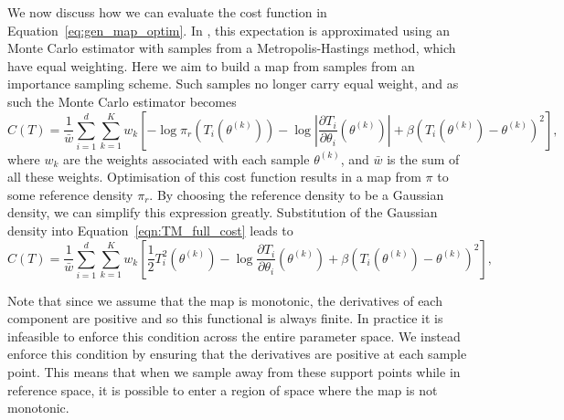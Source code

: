 \documentclass[final]{siamltex}
\newcommand{\edit}[1]{#1}
\begin{document}
\edit{We now discuss how we can evaluate the cost function in
Equation~\eqref{eq:gen_map_optim}. In \cite{parno2018transport}, this
expectation is approximated using an Monte Carlo estimator with samples from
a Metropolis-Hastings method, which have equal weighting.
Here we aim to build a map from
samples from an importance sampling scheme.} Such samples no longer
carry equal weight, and as such the Monte Carlo estimator becomes
\begin{equation}\label{eqn:TM_full_cost}
	C(T) = \frac{1}{\bar{w}}\sum\limits_{i=1}^d \! \sum\limits_{k=1}^K
		w_k \left[-\log\pi_r(T_i(\theta^{(k)})) -
			\log\left|\frac{\partial T_i}{\partial \theta_i}(\theta^{(k)})\right| + \beta(T_i(\theta^{(k)})-\theta^{(k)})^2\right],
\end{equation}
where $w_k$ are the weights associated with each sample $\theta^{(k)}$, and $\bar{w}$ is the sum of
all these weights. Optimisation of this cost function results in a map from $\pi$ to some reference density $\pi_r$. By choosing the reference density to be a Gaussian density, we can simplify this expression greatly. Substitution of the Gaussian density into Equation~\eqref{eqn:TM_full_cost} leads to
\begin{equation}\label{eqn:TETAIS_objective}
	C(T) = \frac{1}{\bar{w}}\sum\limits_{i=1}^d \! \sum\limits_{k=1}^K
		w_k\left[\frac{1}{2}T_i^2(\theta^{(k)}) - \log\frac{\partial
		T_i}{\partial\theta_i}(\theta^{(k)}) + \beta(T_i(\theta^{(k)})-\theta^{(k)})^2\right],
\end{equation}

Note that since we assume that the map is monotonic, the derivatives of each component are
positive and so this functional is always finite. In practice it is infeasible to enforce this condition across the entire parameter space. We instead enforce this condition by ensuring that the derivatives are positive at each sample point. This means that when we sample away from these support points while in reference space, it is possible to enter a region of space where the map is not monotonic.
\end{document}
